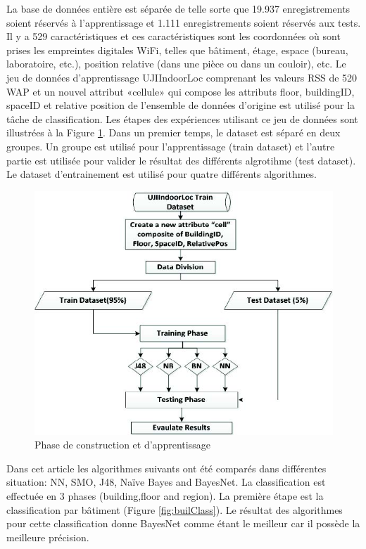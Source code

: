 La base de données entière est séparée de telle sorte que 19.937 enregistrements soient réservés à l'apprentissage et 1.111 enregistrements soient réservés aux tests. Il y a 529 caractéristiques et ces caractéristiques sont les coordonnées où sont prises les empreintes digitales WiFi, telles que bâtiment, étage, espace (bureau, laboratoire, etc.), position relative (dans une pièce ou dans un couloir), etc. Le jeu de données d'apprentissage UJIIndoorLoc comprenant les valeurs RSS de 520 WAP et un nouvel attribut «cellule» qui compose les attributs floor, buildingID, spaceID et relative position de l'ensemble de données d'origine est utilisé pour la tâche de classification. Les étapes des expériences utilisant ce jeu de données sont illustrées à la Figure \ref{fig:newAttribute}. Dans un premier temps, le dataset est séparé en deux groupes. Un groupe est utilisé pour l'apprentissage (train dataset) et l'autre partie est utilisée pour valider le résultat des différents algrotihme (test dataset). Le dataset d'entrainement est utilisé pour quatre différents algorithmes.

\begin{figure}[htp]
	\begin{center}
		\includegraphics[scale=0.7]{figures/newattribute.jpg}
		\caption{Phase de construction et d'apprentissage \cite{ML_algo}}
		\label{fig:newAttribute} %
	\end{center}
\end{figure}

Dans cet article les algorithmes suivants ont été comparés dans différentes situation: NN, SMO, J48, Naïve Bayes and BayesNet. La classification est effectuée en 3 phases (building,floor and region). La première étape est la classification par bâtiment (Figure \ref{fig:builClass}). Le résultat des algorithmes pour cette classification donne BayesNet comme étant le meilleur car il possède la meilleure précision.

